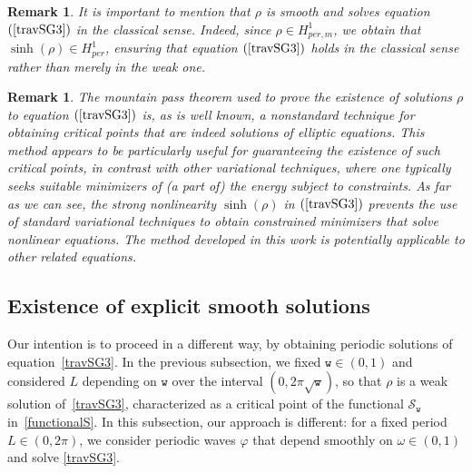 \documentclass[12pt,reqno,a4paper]{amsart} %
\numberwithin{equation}{section}
\numberwithin{figure}{section}
\newtheorem{remark}[theorem]{Remark}
\begin{document}
 \begin{remark} It is important to mention that $\rho$ is smooth and solves equation $(\ref{travSG3})$ in the classical sense. Indeed, since $\rho \in H_{per,m}^1$, we obtain that $\sinh(\rho)\in H_{per}^1$, ensuring that equation $(\ref{travSG3})$ holds in the classical sense rather than merely in the weak one.
\end{remark}
\begin{remark}The mountain pass theorem used to prove the existence of solutions 
$\rho$ to equation 
$(\ref{travSG3})$ is, as is well known, a nonstandard technique for obtaining critical points that are indeed solutions of elliptic equations. This method appears to be particularly useful for guaranteeing the existence of such critical points, in contrast with other variational techniques, where one typically seeks suitable minimizers of (a part of) the energy subject to constraints. As far as we can see, the strong nonlinearity $\sinh(\rho)$ in $(\ref{travSG3})$ prevents the use of standard variational techniques to obtain constrained minimizers that solve nonlinear equations. The method developed in this work is potentially applicable to other related equations.
\end{remark}
 
 \subsection{Existence of explicit smooth solutions} \label{sec.exp.sol}
Our intention is to proceed in a different way, by obtaining periodic solutions of equation~\eqref{travSG3}. In the previous subsection, we fixed $\mathtt{w} \in (0,1)$ and considered $L$ depending on $\mathtt{w}$ over the interval $(0,2\pi \sqrt{\mathtt{w}})$, so that $\rho$ is a weak solution of~\eqref{travSG3}, characterized as a critical point of the functional $\mathcal{S}_{\mathtt{w}}$ in~\eqref{functionalS}. In this subsection, our approach is different: for a fixed period $L \in (0,2\pi)$, we consider periodic waves $\varphi$ that depend smoothly on $\omega \in (0,1)$ and solve \eqref{travSG3}. 
\end{document}
